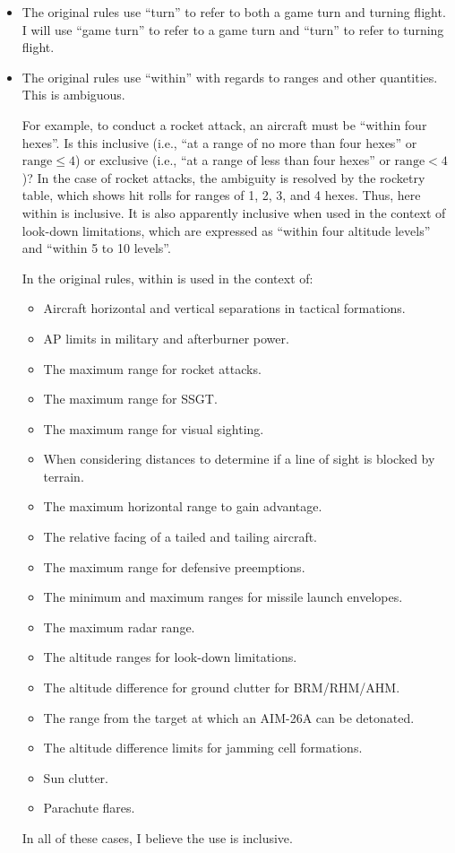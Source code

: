 \documentclass[10pt]{article}
\begin{document}
\begin{itemize}
    \item {} The original rules use “turn” to refer to both a game turn and turning flight. I will use “game turn” to refer to a game turn and “turn” to refer to turning flight.

    \item {} The original rules use “within” with regards to ranges and other quantities. This is ambiguous. 
    
    For example, to conduct a rocket attack, an aircraft must be “within four hexes”. Is this inclusive (i.e., “at a range of no more than four hexes” or $\textrm{range}\le4$) or exclusive (i.e., “at a range of less than four hexes” or $\textrm{range}<4$)? In the case of rocket attacks, the ambiguity is resolved by the rocketry table, which shows hit rolls for ranges of 1, 2, 3, and 4 hexes. Thus, here within is inclusive. It is also apparently inclusive when used in the context of look-down limitations, which are expressed as “within four altitude levels” and “within 5 to 10 levels”.

    In the original rules, within is used in the context of:
    \begin{itemize}
    \item Aircraft horizontal and vertical separations in tactical formations.
    \item AP limits in military and afterburner power.
    \item The maximum range for rocket attacks.
    \item The maximum range for SSGT.
    \item The maximum range for visual sighting.
    \item When considering distances to determine if a line of sight is blocked by terrain.
    \item The maximum horizontal range to gain advantage.
    \item The relative facing of a tailed and tailing aircraft.
    \item The maximum range for defensive preemptions.
    \item The minimum and maximum ranges for missile launch envelopes.
    \item The maximum radar range.
    \item The altitude ranges for look-down limitations.
    \item The altitude difference for ground clutter for BRM/RHM/AHM.
    \item The range from the target at which an AIM-26A can be detonated.
    \item The altitude difference limits for jamming cell formations.
    \item Sun clutter.
    \item Parachute flares.
    \end{itemize}
    In all of these cases, I believe the use is inclusive.

\end{itemize}
\end{document}
